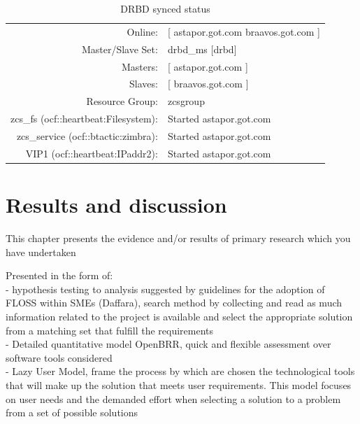 \documentclass[a4paper, 12pt]{book}
\begin{document}
\begin{table}
  \centering
  \begin{tabular}{ | r l | }
    \hline
      Online:                   & [ astapor.got.com braavos.got.com ]\\
      Master/Slave Set: 		& 	drbd\_ms [drbd]\\
      Masters: 					& [ astapor.got.com ]\\
      Slaves: 					& [ braavos.got.com ]\\
      Resource Group: 			& zcsgroup\\
      zcs\_fs (ocf::heartbeat:Filesystem): & Started astapor.got.com\\
      zcs\_service (ocf::btactic:zimbra):  & Started astapor.got.com\\
      VIP1 (ocf::heartbeat:IPaddr2):       & Started astapor.got.com\\
    \hline
  \end{tabular}
\caption{DRBD synced status}
\label{table:sync}
\end{table}




%
\chapter{Results and discussion}
\label{chap:results}

This chapter presents the evidence and/or results of primary research which you have undertaken

\noindent Presented in the form of:\\

\noindent - hypothesis testing to analysis suggested by guidelines for the adoption of FLOSS within SMEs (Daffara), search method by collecting and read as much information related to the project is available and select the appropriate solution from a matching set that fulfill the requirements\\

\noindent - Detailed quantitative model OpenBRR, quick and flexible assessment over software tools considered\\

\noindent - Lazy User Model, frame the process by which are chosen the technological tools that will make up the solution that meets user requirements. This model focuses on user needs and the demanded effort when selecting a solution to a problem from a set of possible solutions
\end{document}
